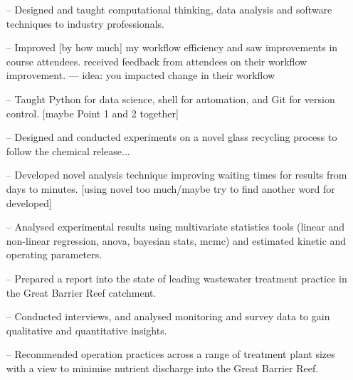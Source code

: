 \documentclass[10pt,a4paper]{altacv}
\begin{document}
\begin{itemize}
    \setlength{\itemindent}{0.5em}
    \item[--]   \small{Designed and taught computational thinking, data analysis and software techniques to industry professionals.}
    \item[--]   \small{Improved [by how much] my workflow efficiency and saw improvements in course attendees. received feedback from attendees on their workflow improvement. --- idea: you impacted change in their workflow}
    \item[--]   \small{Taught Python for data science, shell for automation, and Git for version control. [maybe Point 1 and 2 together]}
\end{itemize}
\divider\smallskip

\begin{itemize}
    \setlength{\itemindent}{0.5em}
    \item[--]   \small{Designed and conducted experiments on a novel glass recycling process to follow the chemical release...}
    \item[--]   \small{Developed novel analysis technique improving waiting times for results from days to minutes. [using novel too much/maybe try to find another word for developed]}
    \item[--]   \small{Analysed experimental results using multivariate statistics tools (linear and non-linear regression, anova, bayesian stats, mcmc) and estimated kinetic and operating parameters.}
\end{itemize}
\divider\smallskip


\begin{itemize}
    \setlength{\itemindent}{0.5em}
    \item[--]   \small{Prepared a report into the state of leading wastewater treatment practice in the Great Barrier Reef catchment.}
    \item[--]   \small{Conducted interviews, and analysed monitoring and survey data to gain qualitative and quantitative insights.}
    \item[--]   \small{Recommended operation practices across a range of treatment plant sizes with a view to minimise         nutrient discharge into the Great Barrier Reef.}
\end{itemize}
\divider\smallskip
\end{document}
